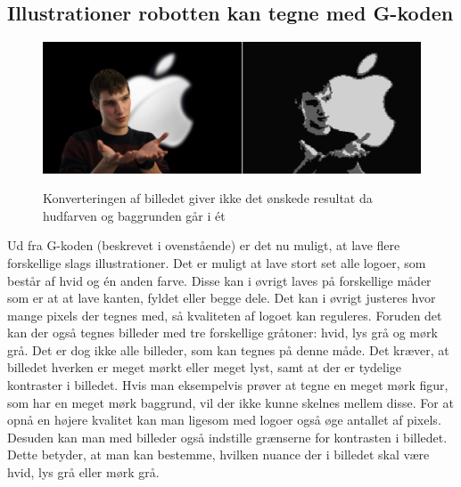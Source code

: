 \subsection{Illustrationer robotten kan tegne med G-koden}
\begin{figure}[h]
	\begin{center}
	\includegraphics[scale=0.4]{Billeder/ubrugeligt.png}\label{fig:ubruglig}
	\caption{Konverteringen af billedet giver ikke det ønskede resultat da hudfarven og baggrunden går i ét}
	\end{center}
\end{figure}
Ud fra G-koden (beskrevet i ovenstående) er det nu muligt, at lave flere forskellige slags illustrationer. 
Det er muligt at lave stort set alle logoer, som består af hvid og én anden farve. Disse kan i øvrigt laves på forskellige måder som er at at lave kanten, fyldet eller begge dele. Det kan i øvrigt justeres hvor mange pixels der tegnes med, så kvaliteten af logoet kan reguleres. 
Foruden det kan der også tegnes billeder med tre forskellige gråtoner: hvid, lys grå og mørk grå. 
Det er dog ikke alle billeder, som kan tegnes på denne måde. Det kræver, at billedet hverken er meget mørkt eller meget lyst, samt at der er tydelige kontraster i billedet. Hvis man eksempelvis prøver at tegne en meget mørk figur, som har en meget mørk baggrund, vil der ikke kunne skelnes mellem disse. 
 For at opnå en højere kvalitet kan man ligesom med logoer også øge antallet af pixels. Desuden kan man med billeder også indstille grænserne for kontrasten i billedet. Dette betyder, at man kan bestemme, hvilken nuance der i billedet skal være hvid, lys grå eller mørk grå. 